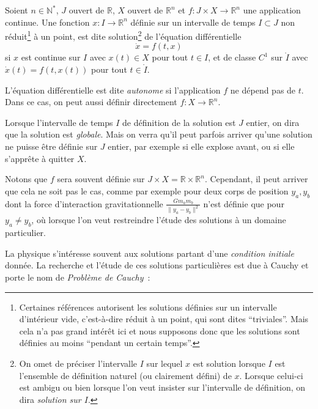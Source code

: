 \hypertarget{solution-dune-uxe9quation-diffuxe9rentielle}{}
\begin{definition}\label{solution-dune-uxe9quation-diffuxe9rentielle}
Soient \(n\in \mathbb{N}^*\), \(J\) ouvert de \(\mathbb{R}\), \(X\)
ouvert de \(\mathbb{R}^{n}\) et \(f:J\times X \to \mathbb{R}^n\) une
application continue. Une fonction \(x:I\to \mathbb{R}^n\) définie sur
un intervalle de temps \(I\subset J\) non réduit\footnote{Certaines
  références autorisent les solutions définies sur un intervalle
  d'intérieur vide, c'est-à-dire réduit à un point, qui sont dites
  ``triviales''. Mais cela n'a pas grand intérêt ici et nous supposons
  donc que les solutions sont définies au moins ``pendant un certain
  temps''.} à un point, est dite solution\footnote{On omet de préciser
  l'intervalle \(I\) sur lequel \(x\) est solution lorsque \(I\) est
  l'ensemble de définition naturel (ou clairement défini) de \(x\).
  Lorsque celui-ci est ambigu ou bien lorsque l'on veut insister sur
  l'intervalle de définition, on dira \emph{solution sur \(I\)}.} de
l'équation différentielle \[
\dot{x} = f(t,x)
\] si \(x\) est continue sur \(I\) avec \(x(t)\in X\) pour tout
\(t\in I\), et de classe \(C^1\) sur \(\mathring{I}\) avec
\(\dot{x}(t) = f(t,x(t))\) pour tout \(t\in \mathring{I}\).

L'équation différentielle est dite \emph{autonome} si l'application
\(f\) ne dépend pas de \(t\). Dans ce cas, on peut aussi définir
directement \(f: X \to \mathbb{R}^n\).

Lorsque l'intervalle de temps \(I\) de définition de la solution est
\(J\) entier, on dira que la solution est \emph{globale}. Mais on verra
qu'il peut parfois arriver qu'une solution ne puisse être définie sur
\(J\) entier, par exemple si elle explose avant, ou si elle s'apprête à
quitter \(X\).
\end{definition}

Notons que \(f\) sera souvent définie sur
\(J\times X=\mathbb{R}\times \mathbb{R}^{n}\). Cependant, il peut
arriver que cela ne soit pas le cas, comme par exemple pour deux corps
de position \(y_a,y_b\) dont la force d'interaction gravitationnelle
\(\frac{Gm_a m_b}{\|y_a-y_b\|^2}\) n'est définie que pour
\(y_a\neq y_b\), où lorsque l'on veut restreindre l'étude des solutions
à un domaine particulier.

La physique s'intéresse souvent aux solutions partant d'une
\emph{condition initiale} donnée. La recherche et l'étude de ces
solutions particulières est due à Cauchy et porte le nom de
\emph{Problème de Cauchy}~:

